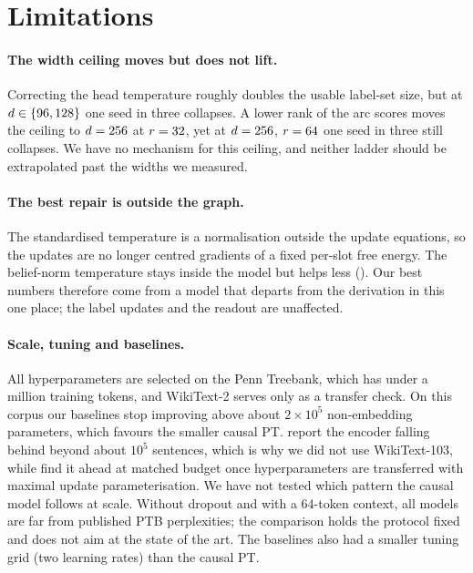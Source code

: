 \section*{Limitations}
\label{sec:limitations}

\paragraph{The width ceiling moves but does not lift.}
Correcting the head temperature roughly doubles the usable label-set size, but at
$d \in \{96, 128\}$ one seed in three collapses. A lower rank of the arc scores moves the
ceiling to $d = 256$ at $r = 32$, yet at $d = 256$,
$r = 64$ one seed in three still collapses. We have no mechanism for this ceiling, and
neither ladder should be extrapolated past the widths we measured.

\paragraph{The best repair is outside the graph.}
The standardised temperature is a normalisation outside the update equations, so the updates
are no longer centred gradients of a fixed per-slot free energy. The belief-norm temperature
stays inside the model but helps less (). Our best numbers therefore come from a
model that departs from the derivation in this one place; the label updates and the readout are
unaffected.

\paragraph{Scale, tuning and baselines.}
All hyperparameters are selected on the Penn Treebank, which has under a million training
tokens, and WikiText-2 serves only as a transfer check. On this corpus our baselines stop
improving above about $2\times10^5$ non-embedding parameters, which favours the smaller causal
PT. \citet{wu2023probabilistic} report the encoder falling behind beyond about $10^5$ sentences,
which is why we did not use WikiText-103, while \citet{kuang2026scaling} find it ahead at
matched budget once hyperparameters are transferred with maximal update parameterisation. We
have not tested which pattern the causal model follows at scale. Without dropout and with a
$64$-token context, all models are far from published PTB perplexities; the comparison holds
the protocol fixed and does not aim at the state of the art. The baselines also had a smaller
tuning grid (two learning rates) than the causal PT.

